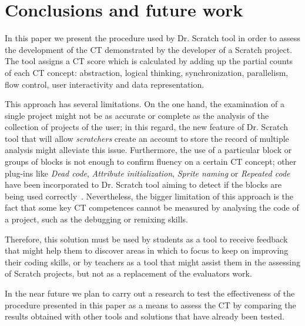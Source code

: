 \documentclass[a4paper,11pt]{article}
\begin{document}
\section{Conclusions and future work}
\label{sec:conclusions}

In this paper we present the procedure used by Dr. Scratch tool in order to assess the development of the CT demonstrated by the developer of a Scratch project. The tool assigns a CT score which is calculated by adding up the partial counts of each CT concept: abstraction, logical thinking, synchronization, parallelism, flow control, user interactivity and data representation.

This approach has several limitations. On the one hand, the examination of a single project might not be as accurate or complete as the analysis of the collection of projects of the user; in this regard, the new feature of Dr. Scratch tool that will allow \emph{scratchers} create an account to store the record of multiple analysis might alleviate this issue. Furthermore, the use of a particular block or groups of blocks is not enough to confirm fluency on a certain CT concept; other plug-ins like \textit{Dead code}, \textit{Attribute initialization}, \textit{Sprite naming} or \textit{Repeated code} have been incorporated to Dr. Scratch tool aiming to detect if the blocks are being used correctly~\cite{moreno2014automatic}. Nevertheless, the bigger limitation of this approach is the fact that some key CT competences cannot be measured by analysing the code of a project, such as the debugging or remixing skills. 

Therefore, this solution must be used by students as a tool to receive feedback that might help them to discover areas in which to focus to keep on improving their coding skills, or by teachers as a tool that might assist them in the assessing of Scratch projects, but not as a replacement of the evaluators work.

In the near future we plan to carry out a research to test the effectiveness of the procedure presented in this paper as a means to assess the CT by comparing the results obtained with other tools and solutions that have already been tested.

\newpage


\end{document}
